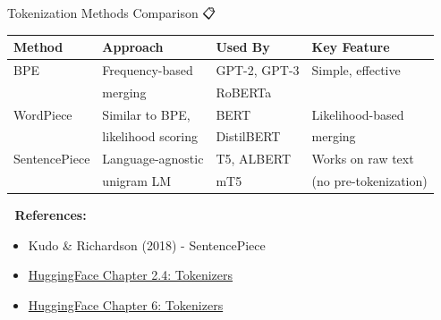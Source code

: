 \documentclass[aspectratio=169]{beamer}
\begin{document}
\begin{frame}{Tokenization Methods Comparison 📋}
    \begin{table}
        \centering
        \small
        \begin{tabular}{llll}
            \toprule
            \textbf{Method} & \textbf{Approach} & \textbf{Used By} & \textbf{Key Feature} \\
            \midrule
            BPE & Frequency-based & GPT-2, GPT-3 & Simple, effective \\
            & merging & RoBERTa & \\
            \midrule
            WordPiece & Similar to BPE, & BERT & Likelihood-based \\
            & likelihood scoring & DistilBERT & merging \\
            \midrule
            SentencePiece & Language-agnostic & T5, ALBERT & Works on raw text \\
            & unigram LM & mT5 & (no pre-tokenization) \\
            \bottomrule
        \end{tabular}
    \end{table}

    \vspace{1em}
    📖 \textbf{References:}
    \begin{itemize}\setlength{\itemsep}{0pt}
        \item Kudo \& Richardson (2018) - SentencePiece
        \item \href{https://huggingface.co/learn/nlp-course/chapter2/4}{HuggingFace Chapter 2.4: Tokenizers}
        \item \href{https://huggingface.co/learn/nlp-course/chapter6}{HuggingFace Chapter 6: Tokenizers}
    \end{itemize}
\end{frame}
\end{document}
